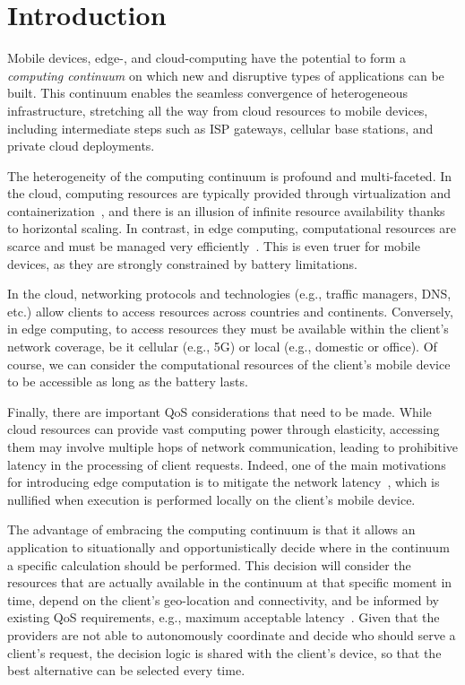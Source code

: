 \section{Introduction}
\label{sec:intro}

Mobile devices, edge-, and cloud-computing have the potential to form a \textit{computing continuum} on which new and disruptive types of applications can be built. This continuum enables the seamless convergence of heterogeneous infrastructure, stretching all the way from cloud resources to mobile devices, including intermediate steps such as ISP gateways, cellular base stations, and private cloud deployments.

The heterogeneity of the computing continuum is profound and multi-faceted. In the cloud, computing resources are typically provided through virtualization and containerization~\cite{leitner2016patterns, Quatrocchi2016discrete}, and there is an illusion of infinite resource availability thanks to horizontal scaling. In contrast, in edge computing, computational resources are scarce and must be managed very efficiently~\cite{Dehos14millimeter5g,GarrigaMendonca2017}. This is even truer for mobile devices, as they are strongly constrained by battery limitations. 

In the cloud, networking protocols and technologies (e.g., traffic managers, DNS, etc.) allow clients to access resources across countries and continents. Conversely, in edge computing, to access resources they must be available within the client's network coverage, be it cellular (e.g., 5G) or local (e.g., domestic or office). Of course, we can consider the computational resources of the client's mobile device to be accessible as long as the battery lasts.

Finally, there are important QoS considerations that need to be made. While cloud resources can provide vast computing power through elasticity, accessing them may involve multiple hops of network communication, leading to prohibitive latency in the processing of client requests. Indeed, one of the main motivations for introducing edge computation is to mitigate the network latency~\cite{Shi:2016}, which is nullified when execution is performed locally on the client's mobile device.

The advantage of embracing the computing continuum is that it allows an application to situationally and opportunistically decide where in the continuum a specific calculation should be performed. This decision will consider the resources that are actually available in the continuum at that specific moment in time, depend on the client's geo-location and connectivity, and be informed by existing QoS requirements, e.g., maximum acceptable latency~\cite{GuptaIfogSim17}. Given that the providers are not able to autonomously coordinate and decide who should serve a client's request, the decision logic is shared with the client's device, so that the best alternative can be selected every time.

